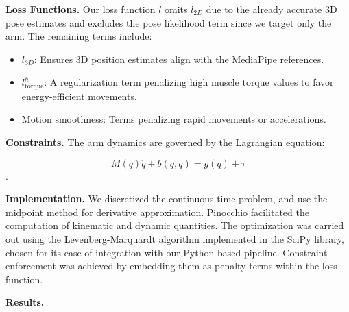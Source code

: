\noindent\textbf{Loss Functions.} Our loss function \(l\) omits \(l_{2D}\) due to the already accurate 3D pose estimates and 
excludes the pose likelihood term since we target only the arm. The remaining terms include:

\begin{itemize}
    \item 
        \(l_{3D}\): Ensures 3D position estimates align with the MediaPipe references.
    \item
        \(l_{\text{torque}}^h\): A regularization term penalizing high muscle torque values to favor energy-efficient movements.
    \item 
        Motion smoothness: Terms penalizing rapid movements or accelerations.
\end{itemize}

\noindent\textbf{Constraints.} The arm dynamics are governed by the Lagrangian equation:

\[
M(q)\ddot{q} + b(q, \dot{q}) = g(q) + \tau
\].

\noindent\textbf{Implementation.} We discretized the continuous-time problem, and use the midpoint method for derivative approximation. 
Pinocchio facilitated the computation of kinematic and dynamic quantities. 
The optimization was carried out using the Levenberg-Marquardt algorithm implemented in the SciPy library, 
chosen for its ease of integration with our Python-based pipeline. 
Constraint enforcement was achieved by embedding them as penalty terms within the loss function.

\noindent\textbf{Results.}